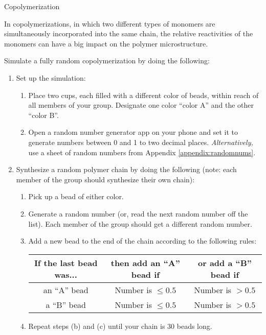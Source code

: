 \begin{activity}{Copolymerization}
\begin{instructornotes}
\end{instructornotes}


\begin{model}
	\label{\labelbase:mdl:simulation}

	In copolymerizations, in which two different types of monomers are simultaneously incorporated into the same chain, the relative reactivities of the monomers can have a big impact on the polymer microstructure.
	
	Simulate a fully random copolymerization by doing the following:
	\begin{enumerate}
		\item Set up the simulation:
			\begin{enumerate}
				\item Place two cups, each filled with a different color of beads, within reach of all members of your group.  Designate one color ``color A'' and the other ``color B''.
				\item Open a random number generator app on your phone and set it to generate numbers between 0 and 1 to two decimal places.  \emph{Alternatively,} use a sheet of random numbers from Appendix \ref{appendix:randomnums}.
			\end{enumerate}
		\item Synthesize a random polymer chain by doing the following (note: each member of the group should synthesize their own chain):
			\begin{enumerate}
				\item Pick up a bead of either color.
				\item Generate a random number (or, read the next random number off the list).  Each member of the group should get a different random number.
				\item Add a new bead to the end of the chain according to the following rules:
					\begin{center}
					\renewcommand{\arraystretch}{1.5}
					\begin{tabular}{|c|c|c|}
						\hline
						\textbf{If the last bead was...} &  \textbf{then add an ``A'' bead if} & \textbf{or add a ``B'' bead if}\\\hline
						 an ``A'' bead & Number is $\leq 0.5$ & Number is $> 0.5$ \\\hline
						 a ``B'' bead & Number is $\leq 0.5$ & Number is $> 0.5$ \\\hline
					\end{tabular}
					\end{center}
				\item Repeat steps (b) and (c) until your chain is 30 beads long.
			\end{enumerate}
	\end{enumerate}
	

\end{model}
\end{activity}
